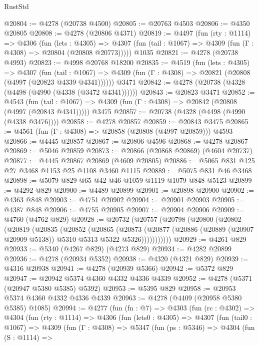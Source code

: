 \begin{lexlean}{RustStd}
\begin{coremodule}
@20804 := @4278 (@20738 @4500)
@20805 := @20763 @4503
@20806 := @4350 @20805
@20808 := @4278 (@20806 @4371)
@20819 := @4497
    (fun (rty : @1114) =>
    @4306
      (fun (lets : @4305) =>
      @4307 (fun (tail : @1067) => @4309 (fun (Γ : @4308) => @20804 (@20808 @20773)))))
    @1035
@20821 := @4278 (@20738 @4993)
@20823 := @4998 @20768 @18200
@20835 := @4519
    (fun (lets : @4305) =>
    @4307
      (fun (tail : @1067) =>
      @4309 (fun (Γ : @4308) => @20821 (@20808 (@4997 (@20823 @4339 @4341))))))
    @3471
@20842 := @4278 (@20738 (@4328 (@4498 (@4990 (@4338 (@3472 @4341))))))
@20843 := @20823 @3471
@20852 := @4543
    (fun (tail : @1067) => @4309 (fun (Γ : @4308) => @20842 (@20808 (@4997 (@20843 @4341)))))
    @3475
@20857 := @20738 (@4328 (@4498 (@4990 (@4338 @3476))))
@20858 := @4278 @20857
@20859 := @20843 @3475
@20865 := @4561 (fun (Γ : @4308) => @20858 (@20808 (@4997 @20859))) @4593
@20866 := @4445 @20857
@20867 := @20806 @4596
@20868 := @4278 @20867
@20869 := @5046 @20859
@20873 := @20866 (@20868 @20869) (@4604 @20737)
@20877 := @4445 @20867 @20869 (@4609 @20805)
@20886 := @5065 @831 @125 @27 @3468 @1153 @25 @1108 @3460 @1115
@20889 := @5075 @831 @46 @3468
@20898 := @5079 @829 @65 @42 @46 @1059 @1119 @1079 @848 @5123
@20899 := @4292 @829
@20900 := @4489 @20899
@20901 := @20898 @20900
@20902 := @4363 @848
@20903 := @4751 @20902
@20904 := @20901 @20903
@20905 := @4387 @848
@20906 := @4755 @20905
@20907 := @20904 @20906
@20909 := @4760 (@4762 @829)
@20928 := @20732
    (@20757
      (@20798
        (@20800
          (@20802
            (@20819
              (@20835
                (@20852
                  (@20865
                    (@20873
                      (@20877
                        (@20886 (@20889 (@20907 @20909 @5138)) @5310 @5313 @5322 @5326)))))))))))
@20929 := @4261 @829
@20933 := @5340 (@4267 @829) (@4273 @829)
@20934 := @4282 @20899
@20936 := @4278 (@20934 @5352)
@20938 := @4320 (@4321 @829)
@20939 := @4316 @20938
@20941 := @4278 (@20939 @5366)
@20942 := @5372 @829
@20947 := @20942 @5374 @4360 @4332 @4336 @4339
@20952 := @4278 (@5371 (@20947 @5380 @5385) @5392)
@20953 := @5395 @829
@20958 := @20953 @5374 @4360 @4332 @4336 @4339
@20963 := @4278 (@4409 (@20958 @5380 @5385) @1085)
@20994 := @4277
    (fun (fn : @7) =>
    @4303
      (fun (rc : @4302) =>
      @4304
        (fun (rty : @1114) =>
        @4306
          (fun (lets0 : @4305) =>
          @4307
            (fun (tail0 : @1067) =>
            @4309
              (fun (Γ : @4308) =>
              @5347
                (fun (ps : @5346) =>
                @4304
                  (fun (S : @1114) =>

\end{coremodule}
\end{lexlean}
